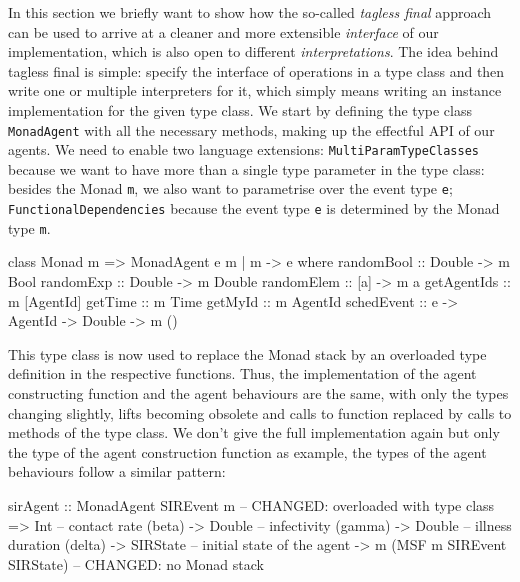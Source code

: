 \medskip

In this section we briefly want to show how the so-called \textit{tagless final} approach \cite{kiselyov_typed_2012} can be used to arrive at a cleaner and more extensible \textit{interface} of our implementation, which is also open to different \textit{interpretations}. The idea behind tagless final is simple: specify the interface of operations in a type class and then write one or multiple interpreters for it, which simply means writing an instance implementation for the given type class. We start by defining the type class \texttt{MonadAgent} with all the necessary methods, making up the effectful API of our agents. We need to enable two language extensions: \texttt{MultiParamTypeClasses} because we want to have more than a single type parameter in the type class: besides the Monad \texttt{m}, we also want to parametrise over the event type \texttt{e}; \texttt{FunctionalDependencies} because the event type \texttt{e} is determined by the Monad type \texttt{m}.

\begin{HaskellCode}
class Monad m => MonadAgent e m | m -> e where
  randomBool  :: Double -> m Bool
  randomExp   :: Double -> m Double
  randomElem  :: [a] -> m a
  getAgentIds :: m [AgentId]
  getTime     :: m Time
  getMyId     :: m AgentId
  schedEvent  :: e -> AgentId -> Double -> m ()
\end{HaskellCode}

This type class is now used to replace the Monad stack by an overloaded type definition in the respective functions. Thus, the implementation of the agent constructing function and the agent behaviours are the same, with only the types changing slightly, lifts becoming obsolete and calls to function replaced by calls to methods of the type class. We don't give the full implementation again but only the type of the agent construction function as example, the types of the agent behaviours follow a similar pattern: 

\begin{HaskellCode}
sirAgent :: MonadAgent SIREvent m       -- CHANGED: overloaded with type class
         => Int                         -- contact rate (beta)
         -> Double                      -- infectivity (gamma)
         -> Double                      -- illness duration (delta)
         -> SIRState                    -- initial state of the agent
         -> m (MSF m SIREvent SIRState) -- CHANGED: no Monad stack
\end{HaskellCode}

